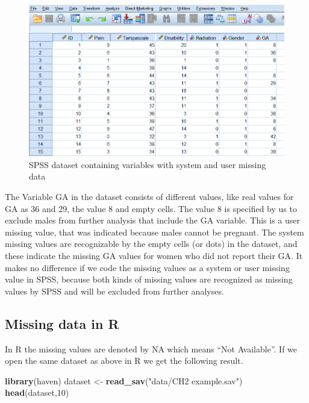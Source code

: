 \documentclass[]{book}
\newenvironment{Shaded}{\begin{snugshade}}{\end{snugshade}}
\newcommand{\KeywordTok}[1]{\textcolor[rgb]{0.13,0.29,0.53}{\textbf{#1}}}
\newcommand{\DecValTok}[1]{\textcolor[rgb]{0.00,0.00,0.81}{#1}}
\newcommand{\StringTok}[1]{\textcolor[rgb]{0.31,0.60,0.02}{#1}}
\newcommand{\NormalTok}[1]{#1}
\begin{document}
\begin{figure}

{\centering \includegraphics[width=0.9\linewidth]{images/fig2.1} 

}

\caption{SPSS dataset containing variables with system and user missing data}\label{fig:fig27}
\end{figure}

The Variable GA in the dataset consists of different values, like real
values for GA as 36 and 29, the value 8 and empty cells. The value 8 is
specified by us to exclude males from further analysis that include the
GA variable. This is a user missing value, that was indicated because
males cannot be pregnant. The system missing values are recognizable by
the empty cells (or dots) in the dataset, and these indicate the missing
GA values for women who did not report their GA. It makes no difference
if we code the missing values as a system or user missing value in SPSS,
because both kinds of missing values are recognized as missing values by
SPSS and will be excluded from further analyses.

\subsection{Missing data in R}\label{missing-data-in-r}

In R the missing values are denoted by NA which means ``Not Available''.
If we open the same dataset as above in R we get the following result.

\begin{Shaded}
\begin{Highlighting}[]
\KeywordTok{library}\NormalTok{(haven)}
\NormalTok{dataset <-}\StringTok{ }\KeywordTok{read_sav}\NormalTok{(}\StringTok{"data/CH2 example.sav"}\NormalTok{)}
\KeywordTok{head}\NormalTok{(dataset,}\DecValTok{10}\NormalTok{)}
\end{Highlighting}
\end{Shaded}
\end{document}
